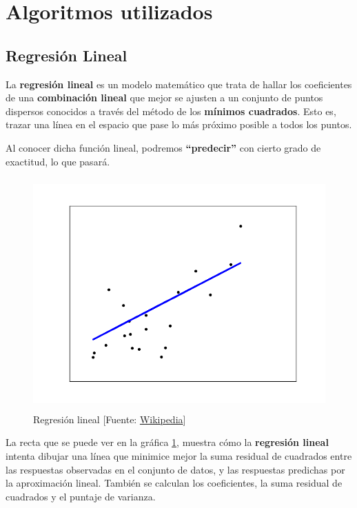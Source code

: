 \section{Algoritmos utilizados}
\label{makereference4.3}
	\subsection{Regresión Lineal}
	\label{makereference4.3.1}

	La \textbf{regresión lineal} es un modelo matemático que trata de hallar los coeficientes de una \textbf{combinación lineal} que mejor se ajusten a un conjunto de puntos dispersos conocidos a través del método de los \textbf{mínimos cuadrados}. Esto es, trazar una línea en el espacio que pase lo más próximo posible a todos los puntos.

	Al conocer dicha función lineal, podremos \textbf{``predecir''} con cierto grado de exactitud, lo que pasará.

	\begin{figure}[htb]
		
		\begin{center}
			\includegraphics[height=3.5in]{figures/regression.png}
			\caption{Regresión lineal [Fuente: \href{www.wikipedia.org}{Wikipedia}]}
		\end{center}
		
		\label{regression}
	\end{figure}
	
	La recta que se puede ver en la gráfica \ref{regression}, muestra cómo la \textbf{regresión lineal} intenta dibujar una línea que minimice mejor la suma residual de cuadrados entre las respuestas observadas en el conjunto de datos, y las respuestas predichas por la aproximación lineal.
	También se calculan los coeficientes, la suma residual de cuadrados y el puntaje de varianza.

